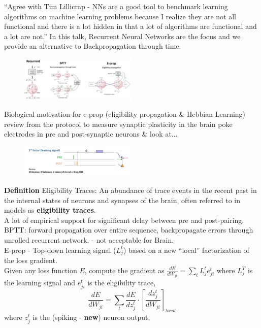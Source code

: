 \documentclass[12pt]{article}
\begin{document}
``Agree with Tim Lillicrap - NNs are a good tool to benchmark learning algorithms on machine learning problems because I realize they are not all functional and there is a lot hidden in that a lot of algorithms are functional and a lot are not.'' In this talk, Recurrent Neural Networks are the focus and we provide an alternative to Backpropagation through time. \\
\begin{figure}
  \centering
      \includegraphics[width=0.5\textwidth]{images/eprop.png}
  \caption{}
\end{figure}

Biological motivation for e-prop (eligibility propagation \& Hebbian Learning) review from \cite{Gerstner18} the protocol to measure synaptic plasticity in the brain poke electrodes in pre and post-synaptic neurons \& look at... \\
\begin{figure}
  \centering
      \includegraphics[width=0.5\textwidth]{images/3fl.png}
  \caption{}
\end{figure}

\textbf{Definition} Eligibility Traces: An abundance of trace events in the recent past in the internal states of neurons and synapses of the brain, often referred to in models as \textbf{eligibility traces}. \\

A lot of empirical support for significant delay between pre and post-pairing. \\

BPTT: forward propagation over entire sequence, backpropagate errors through unrolled recurrent network. - not acceptable for Brain. \\

E-prop - Top-down learning signal ($L_j^t$) based on a new ``local'' factorization of the loss gradient. \\

Given any loss function $E$, compute the gradient as $\frac{dE}{dW_{ji}} = \sum_t L_j^te_{ji}^t$ where $L_j^T$ is the learning signal and $e^t_{ji}$ is the eligibility trace, 
$$\frac{dE}{dW_{ji}} = \sum_t \frac{dE}{dz_j^t}\cdot[\frac{dz_j^t}{dW_{ji}}]_{local}$$
where $z_j^t$ is the (spiking - \textbf{new}) neuron output. \\
\end{document}
